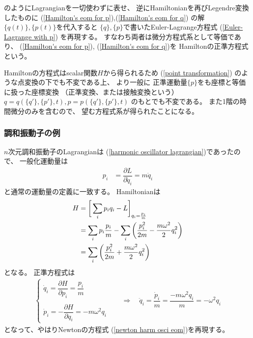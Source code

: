 のようにLagrangianを一切使わずに表せ、
逆にHamiltonianを再びLegendre変換したものに
(\ref{Hamilton's eom for p}),(\ref{Hamilton's eom for q})
の解$\{q(t)\},\{p(t)\}$を代入すると
$\{q\},\{p\}$で書いたEuler-Lagrange方程式
(\ref{Euler-Lagrange with p})
を再現する。
すなわち両者は微分方程式系として等価であり、
(\ref{Hamilton's eom for p}),
(\ref{Hamilton's eom for q})を
Hamiltonの正準方程式という。

Hamiltonの方程式はscalar関数$H$から得られるため
(\ref{point transformation})
のような点変換の下でも不変である上、
より一般に
正準運動量$\{p\}$をも座標と等価に扱った座標変換
（正準変換、または接触変換という）
$q = q(\{q'\}, \{p'\}, t ) ,
p = p(\{q'\}, \{p'\}, t )
$
のもとでも不変である。
また1階の時間微分のみを含むので、
望む方程式系が得られたことになる。

\subsubsection{調和振動子の例}

$n$次元調和振動子のLagrangianは
(\ref{harmonic oscillator lagrangian})であったので、
一般化運動量は
\begin{align}
  p_i &= \dfrac{\partial L}{\partial \dot{q}_i}
=
  m \dot{q}_i
\end{align}
と通常の運動量の定義に一致する。
Hamiltonianは
\begin{align}
  H &= \bigg[
    \sum_i p_i \dot{q}_i
    - L
    \bigg]_{ \dot{q}_i = \frac{p_i}{m} }
\notag\\&=
    \sum_i p_i \frac{p_i}{m}
    -
      \sum_i \bigg(
      \dfrac{p_i^2}{2m}
    -
      \dfrac{ m \omega^2 }{2}
      q_i^2
    \bigg)
\notag\\&=
    \sum_i \bigg(
      \dfrac{p_i^2}{2m}
    +
      \dfrac{ m \omega^2 }{2}
      q_i^2
    \bigg)
\end{align}
となる。
正準方程式は
\begin{align}
  \begin{cases}
    \dot{q}_i = \dfrac{\partial H}{\partial p_i}
    = \dfrac{p_i}{m}
  \\
  \\
    \dot{p}_i = - \dfrac{\partial H}{\partial q_i}
    = - m \omega^2 q_i
  \end{cases}
\quad
&\Rightarrow
\quad
  \ddot{q}_i = \dfrac{\dot{p}_i}{m}
  = \dfrac{- m \omega^2 q_i}{m}
  = - \omega^2 q_i
\label{hamiltonian e.o.m for harmonic oscillator}
\end{align}
となって、やはりNewtonの方程式
(\ref{newton harm osci eom})を再現する。


